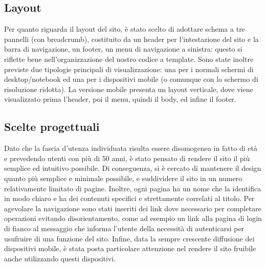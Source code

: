 \subsection{Layout}
Per quanto riguarda il layout del sito, è stato scelto di adottare schema a tre pannelli (con breadcrumb), costituito da un header per l’intestazione del sito e la barra di navigazione, un footer, un menu di navigazione a sinistra: questo si riflette bene nell'organizzazione del nostro codice a template.
Sono state inoltre previste due tipologie principali di visualizzazione: una per i normali schermi di desktop/notebook ed una per i dispositivi mobile (o comunque con lo schermo di risoluzione ridotta). \newline
La versione mobile presenta un layout verticale, dove viene visualizzato prima l'header, poi il menu, quindi il body, ed infine il footer.

\subsection{Scelte progettuali}
Dato che la fascia d'utenza individuata risulta essere disomogenea in fatto di età e prevedendo utenti con più di 50 anni, è stato pensato di rendere il sito il più semplice ed intuitivo possibile. Di conseguenza, si è cercato di mantenere il design quanto più semplice e minimale possibile, e suddividere il sito in un numero relativamente limitato di pagine. Inoltre, ogni pagina ha un nome che la identifica in modo chiaro e ha dei contenuti specifici e strettamente correlati al titolo. Per agevolare la navigazione sono stati inseriti dei link dove necessario per completare operazioni evitando disorientamento, come ad esempio un link alla pagina di login di fianco al messaggio che informa l'utente della necessità di autenticarsi per usufruire di una funzione del sito. \newline
Infine, data la sempre crescente diffusione dei dispositivi mobile, è stata posta particolare attenzione nel rendere il sito fruibile anche utilizzando questi dispositivi. 
	